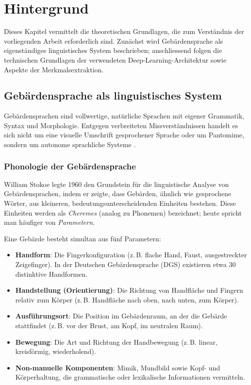 \chapter{Hintergrund}
\label{ch:background}

Dieses Kapitel vermittelt die theoretischen Grundlagen, die zum Verständnis der vorliegenden Arbeit erforderlich sind. Zunächst wird Gebärdensprache als eigenständiges linguistisches System beschrieben; anschliessend folgen die technischen Grundlagen der verwendeten Deep-Learning-Architektur sowie Aspekte der Merkmalsextraktion.

\section{Gebärdensprache als linguistisches System}

Gebärdensprachen sind vollwertige, natürliche Sprachen mit eigener Grammatik, Syntax und Morphologie. Entgegen verbreiteten Missverständnissen handelt es sich nicht um eine visuelle Umschrift gesprochener Sprache oder um Pantomime, sondern um autonome sprachliche Systeme \cite{stokoe1960}.

\subsection{Phonologie der Gebärdensprache}

William Stokoe legte 1960 den Grundstein für die linguistische Analyse von Gebärdensprachen, indem er zeigte, dass Gebärden, ähnlich wie gesprochene Wörter, aus kleineren, bedeutungsunterscheidenden Einheiten bestehen. Diese Einheiten werden als \textit{Cheremes} (analog zu Phonemen) bezeichnet; heute spricht man häufiger von \textit{Parametern}.

Eine Gebärde besteht simultan aus fünf Parametern:

\begin{itemize}
    \item \textbf{Handform}: Die Fingerkonfiguration (z.\,B. flache Hand, Faust, ausgestreckter Zeigefinger). In der Deutschen Gebärdensprache (DGS) existieren etwa 30 distinktive Handformen.
    \item \textbf{Handstellung (Orientierung)}: Die Richtung von Handfläche und Fingern relativ zum Körper (z.\,B. Handfläche nach oben, nach unten, zum Körper).
    \item \textbf{Ausführungsort}: Die Position im Gebärdenraum, an der die Gebärde stattfindet (z.\,B. vor der Brust, am Kopf, im neutralen Raum).
    \item \textbf{Bewegung}: Die Art und Richtung der Handbewegung (z.\,B. linear, kreisförmig, wiederholend).
    \item \textbf{Non-manuelle Komponenten}: Mimik, Mundbild sowie Kopf- und Körperhaltung, die grammatische oder lexikalische Informationen vermitteln.
\end{itemize}

